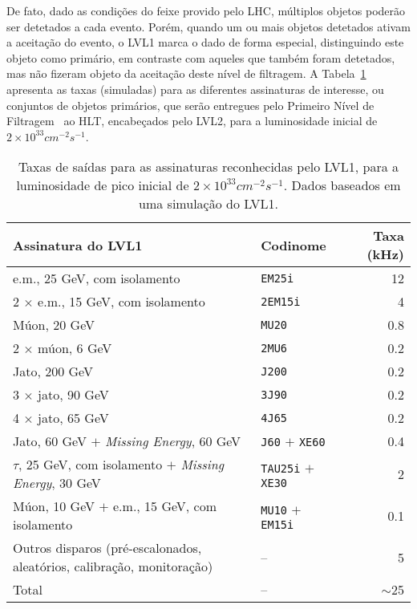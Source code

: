 De fato, dado as condições do feixe provido pelo LHC, múltiplos objetos
poderão ser detetados a cada evento. Porém, quando um ou mais objetos
detetados ativam a aceitação do evento, o LVL1 marca o dado de forma especial,
distinguindo este objeto como primário, em contraste com aqueles que também
foram detetados, mas não fizeram objeto da aceitação deste nível de
filtragem. A Tabela~\ref{tab:l1-rates} apresenta as taxas (simuladas) para as
diferentes assinaturas de interesse, ou conjuntos de objetos primários, que
serão entregues pelo Primeiro Nível de Filtragem~\cite{hlt-tdr} ao HLT,
encabeçados pelo LVL2, para a luminosidade inicial de
$2\times10^{33}cm^{-2}s^{-1}$.

\begin{table}
\begin{center}
\begin{sideways}
\begin{tabular}{|l|l|r|}
\hline
\textbf{Assinatura do LVL1} & \textbf{Codinome} & \textbf{Taxa (kHz)} \\ \hline
e.m., 25 GeV, com isolamento & \texttt{EM25i} & 12 \\ \hline
2 $\times$ e.m., 15 GeV, com isolamento & \texttt{2EM15i} & 4 \\ \hline
Múon, 20 GeV & \texttt{MU20} & 0.8 \\ \hline
2 $\times$ múon, 6 GeV & \texttt{2MU6} & 0.2 \\ \hline
Jato, 200 GeV & \texttt{J200} & 0.2 \\ \hline
3 $\times$ jato, 90 GeV & \texttt{3J90} & 0.2 \\ \hline
4 $\times$ jato, 65 GeV & \texttt{4J65} & 0.2 \\ \hline
Jato, 60 GeV $+$ \textit{Missing Energy}, 60 GeV & \texttt{J60} $+$
\texttt{XE60} & 0.4 \\ \hline
$\tau$, 25 GeV, com isolamento $+$ \textit{Missing Energy}, 30 GeV &
\texttt{TAU25i} $+$ \texttt{XE30} & 2 \\
\hline
Múon, 10 GeV $+$ e.m., 15 GeV, com isolamento & \texttt{MU10} $+$ \texttt{EM15i} & 0.1 \\ \hline
Outros disparos (pré-escalonados, aleatórios, calibração, monitoração) & -- & 5 \\
\hline
Total & -- & $\sim$25 \\ \hline
\end{tabular}
\end{sideways}
\end{center}
\caption{Taxas de saídas para as assinaturas reconhecidas pelo LVL1,
para a luminosidade de pico inicial de $2\times10^{33}cm^{-2}s^{-1}$. Dados
baseados em uma simulação do LVL1.}
\label{tab:l1-rates}
\end{table}


